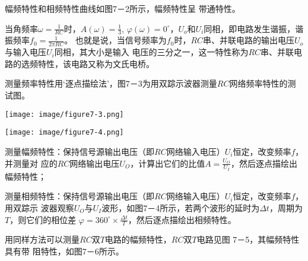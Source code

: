 \documentclass[UTF8]{article}
\begin{document}
            \noindent\hspace{2em}幅频特性和相频特性曲线如图7－2所示，幅频特性呈
            带通特性。
            \par
            \noindent\hspace{2em}当角频率$\omega = \frac{1}{RC}$时，$A(\omega) = \frac{1}{3}$,
            $\varphi(\omega) = 0^{\circ}$，$U_o$和$U_i$同相，即电路发生谐振，谐振频率$f_0 = \frac{1}{2\pi RC}$。
            也就是说，当信号频率为$f_0$时，$RC$串、并联电路的输出电压$U_o$与输入电压$U_i$同相，其大小是输入
            电压的三分之一，这一特性称为$RC$串、并联电路的选频特性，该电路又称为文氏电桥。
            \par
            \noindent\hspace{2em}测量频率特性用‘逐点描绘法’，图7－3为用双踪示波器测量$RC$网络频率特性的测试图。
            \begin{adjustwidth}{0em}{0em}
                \begin{minipage}[H]{0.45\textwidth}
                    \centering
                    \texttt{[image: image/figure7-3.png]}
                \end{minipage}
                \hfill
                \begin{minipage}[H]{0.45\textwidth}
                    \centering
                    \texttt{[image: image/figure7-4.png]}
                \end{minipage}
            \end{adjustwidth}
            \par
            \noindent\hspace{2em}测量幅频特性：保持信号源输出电压（即$RC$网络输入电压）$U_i$恒定，改变频率$f$，并测量对
            应的$RC$网络输出电压$U_O$，计算出它们的比值$A=\frac{U_O}{U_I}$，然后逐点描绘出幅频特性；
            \par
            \noindent\hspace{2em}测量相频特性：保持信号源输出电压（即$RC$网络输入电压）$U_i$恒定，改变频率$f$，用双踪示
            波器观察$U_O$与$U_I$波形，如图7－4所示，若两个波形的延时为$\Delta t$，周期为$T$，则它们的相位差
            $\varphi = 360^{\circ} \times \frac{\Delta t}{T}$，然后逐点描绘出相频特性。
            \par
            \noindent\hspace{2em}用同样方法可以测量$RC$双$T$电路的幅频特性，$RC$双$T$电路见图 7－5，其幅频特性具有带
            阻特性，如图7－6所示。
\end{document}
